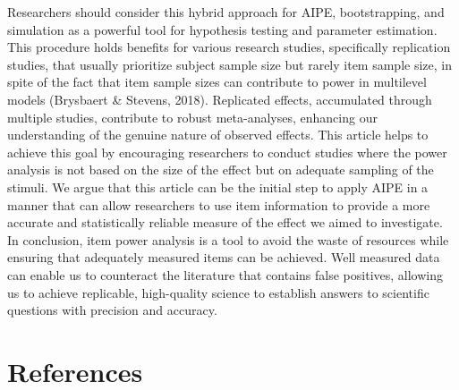\documentclass[
  man]{apa7}
\begin{document}
Researchers should consider this hybrid approach for AIPE, bootstrapping, and simulation as a powerful tool for hypothesis testing and parameter estimation. This procedure holds benefits for various research studies, specifically replication studies, that usually prioritize subject sample size but rarely item sample size, in spite of the fact that item sample sizes can contribute to power in multilevel models (Brysbaert \& Stevens, 2018). Replicated effects, accumulated through multiple studies, contribute to robust meta-analyses, enhancing our understanding of the genuine nature of observed effects. This article helps to achieve this goal by encouraging researchers to conduct studies where the power analysis is not based on the size of the effect but on adequate sampling of the stimuli. We argue that this article can be the initial step to apply AIPE in a manner that can allow researchers to use item information to provide a more accurate and statistically reliable measure of the effect we aimed to investigate. In conclusion, item power analysis is a tool to avoid the waste of resources while ensuring that adequately measured items can be achieved. Well measured data can enable us to counteract the literature that contains false positives, allowing us to achieve replicable, high-quality science to establish answers to scientific questions with precision and accuracy.

\newpage

\hypertarget{references}{%
\section{References}\label{references}}

\begingroup
\setlength{\parindent}{-0.5in}
\setlength{\leftskip}{0.5in}
\end{document}
